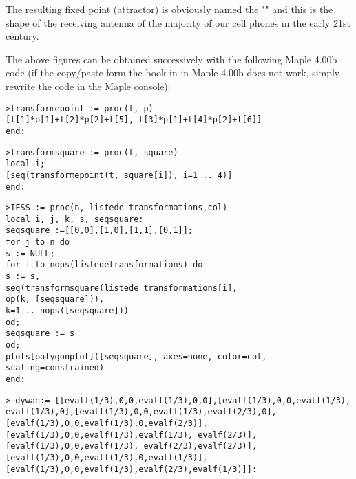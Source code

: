 	The resulting fixed point (attractor) is obviously named the "" and this is the shape of the receiving antenna of the majority of our cell phones in the early 21st century.

	The above figures can be obtained successively with the following Maple 4.00b code (if the copy/paste form the book in in Maple 4.00b does not work, simply rewrite the code in the Maple console):
	
	\texttt{>transforme\textunderscore point := proc(t, p)}\\
      	\texttt{[t[1]*p[1]+t[2]*p[2]+t[5], t[3]*p[1]+t[4]*p[2]+t[6]]}\\
		\texttt{end:}

	\texttt{>transform\textunderscore square := proc(t, square) }\\
      	\texttt{local i;}\\
     	\texttt{[seq(transforme\textunderscore point(t, square[i]), i=1 .. 4)]}\\
		\texttt{end:}

		\texttt{>IFSS := proc(n, liste\textunderscore de \textunderscore transformations,col)}\\
      	\texttt{local i, j, k, s, seq\textunderscore square:}\\
      	\texttt{seq\textunderscore square :=[[0,0],[1,0],[1,1],[0,1]];}\\
      	\texttt{for j to n do}\\
      	\texttt{s := NULL;}\\
      	\texttt{for i to nops(liste\textunderscore de\textunderscore transformations) do}\\
         	\texttt{s := s,}\\
         	\texttt{seq(transform\textunderscore square(liste\textunderscore de \textunderscore transformations[i],}\\
         	\texttt{op(k, [seq\textunderscore square])),}\\
         	\texttt{k=1 .. nops([seq\textunderscore square]))}\\
       	\texttt{od;}\\
       	\texttt{seq\textunderscore square := s }\\
     	\texttt{od;}\\
     	\texttt{plots[polygonplot]([seq\textunderscore square], axes=none, color=col, scaling=constrained)}\\
   	\texttt{end:}

		\texttt{> dywan:= [[evalf(1/3),0,0,evalf(1/3),0,0],[evalf(1/3),0,0,evalf(1/3), evalf(1/3),0],[evalf(1/3),0,0,evalf(1/3),evalf(2/3),0],  [evalf(1/3),0,0,evalf(1/3),0,evalf(2/3)], [evalf(1/3),0,0,evalf(1/3),evalf(1/3), evalf(2/3)],[evalf(1/3),0,0,evalf(1/3), evalf(2/3),evalf(2/3)],	[evalf(1/3),0,0,evalf(1/3),0,evalf(1/3)], [evalf(1/3),0,0,evalf(1/3),evalf(2/3),evalf(1/3)]]:}\\

